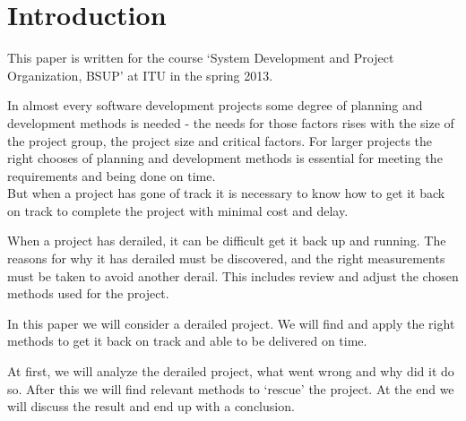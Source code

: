 \section{Introduction}
This paper is written for the course `System Development and Project Organization, BSUP' at ITU in the spring 2013.

In almost every software development projects some degree of planning and development methods is needed - the needs for those factors rises with the size of the project group, the project size and critical factors. For larger projects the right chooses of planning and development methods is essential for meeting the requirements and being done on time.\\
But when a project has gone of track it is necessary to know how to get it back on track to complete the project with minimal cost and delay.

When a project has derailed, it can be difficult get it back up and running. The reasons for why it has derailed must be discovered, and the right measurements must be taken to avoid another derail. This includes review and adjust the chosen methods used for the project.

In this paper we will consider a derailed project. We will find and apply the right methods to get it back on track and able to be delivered on time.

At first, we will analyze the derailed project, what went wrong and why did it do so. After this we will find relevant methods to `rescue' the project. At the end we will discuss the result and end up with a conclusion.
\newpage